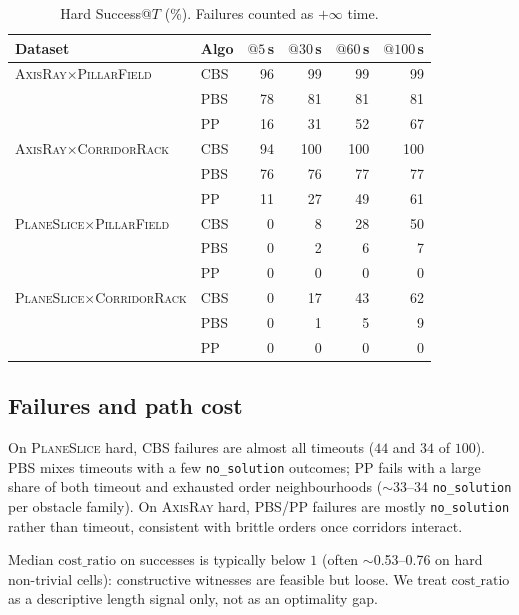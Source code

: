 \begin{table}[t]
  \centering
  \caption{Hard Success@$T$ (\%). Failures counted as $+\infty$ time.}
  \label{tab:success-at-t}
  \setlength{\tabcolsep}{3.5pt}
  \begin{tabular}{@{}llrrrr@{}}
    \toprule
    Dataset & Algo & $@5$\,s & $@30$\,s & $@60$\,s & $@100$\,s \\
    \midrule
    \textsc{AxisRay}$\times$\textsc{PillarField}
      & CBS & 96 & 99 & 99 & 99 \\
      & PBS & 78 & 81 & 81 & 81 \\
      & PP  & 16 & 31 & 52 & 67 \\
    \midrule
    \textsc{AxisRay}$\times$\textsc{CorridorRack}
      & CBS & 94 & 100 & 100 & 100 \\
      & PBS & 76 &  76 &  77 &  77 \\
      & PP  & 11 &  27 &  49 &  61 \\
    \midrule
    \textsc{PlaneSlice}$\times$\textsc{PillarField}
      & CBS &  0 &  8 & 28 & 50 \\
      & PBS &  0 &  2 &  6 &  7 \\
      & PP  &  0 &  0 &  0 &  0 \\
    \midrule
    \textsc{PlaneSlice}$\times$\textsc{CorridorRack}
      & CBS &  0 & 17 & 43 & 62 \\
      & PBS &  0 &  1 &  5 &  9 \\
      & PP  &  0 &  0 &  0 &  0 \\
    \bottomrule
  \end{tabular}
\end{table}

\subsection{Failures and path cost}
\label{sec:fail-cost}

On \textsc{PlaneSlice} hard, CBS failures are almost all timeouts
($44$ and $34$ of $100$).
PBS mixes timeouts with a few \texttt{no\_solution} outcomes; PP fails with a
large share of both timeout and exhausted order neighbourhoods
($\sim$33--34 \texttt{no\_solution} per obstacle family).
On \textsc{AxisRay} hard, PBS/PP failures are mostly \texttt{no\_solution}
rather than timeout, consistent with brittle orders once corridors interact.

Median $\mathrm{cost\_ratio}$ on successes is typically below $1$
(often $\sim$0.53--0.76 on hard non-trivial cells): constructive witnesses are
feasible but loose.
We treat $\mathrm{cost\_ratio}$ as a descriptive length signal only, not as an
optimality gap.
